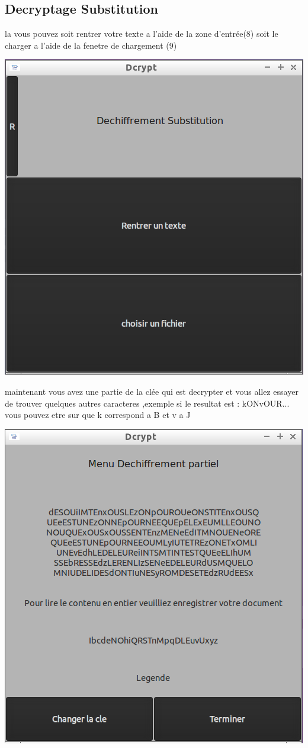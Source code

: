 \documentclass[a4]{article}
\begin{document}
		\subsection{Decryptage Substitution}
			la vous pouvez soit rentrer votre texte a l'aide de la zone d'entrée(8)
			soit le charger a l'aide de la fenetre de chargement (9)
			\begin{center}\includegraphics[scale=0.4]{10.png}\end{center}
			maintenant vous avez une partie de la clée qui est decrypter et vous allez 
			essayer de trouver quelques autres caracteres ,exemple si le resultat est :
			kONvOUR... vous pouvez etre sur que k correspond a B et v a J 
			\begin{center}\includegraphics[scale=0.4]{13.png}\end{center}
\end{document}
